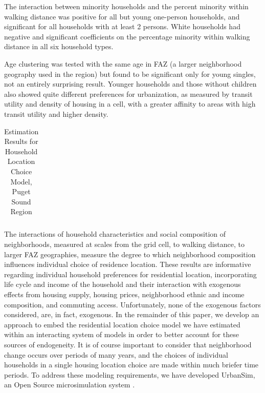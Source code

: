 \documentclass[12pt,a4paper]{article}
\begin{document}
The interaction between minority households and the percent
minority within walking distance was positive for all but young
one-person households, and significant for all households with at
least 2 persons.  White households had negative and significant
coefficients on the percentage minority within walking distance in
all six household types.

Age clustering was tested with the same age in FAZ (a larger
neighborhood geography used in the region) but found to be
significant only for young singles, not an entirely surprising
result.  Younger households and those without children also showed
quite different preferences for urbanization, as measured by transit
utility and density of housing in a cell, with a greater affinity to
areas with high transit utility and higher density.

\clearpage
\begin{table}[h]
\caption{Estimation Results for Household Location Choice Model,
Puget Sound Region} \label{tab:hlc} \centering
\begin{tabular}{lrr|rr|rr}
\\

\end{tabular}

\end{table}
\clearpage

The interactions of household characteristics and social
composition of neighborhoods, measured at scales from the grid
cell, to walking distance, to larger FAZ geographies, measure the
degree to which neighborhood composition influences individual
choice of residence location.  These results are informative regarding 
individual household
preferences for residential location, incorporating life cycle and
income of the household and their interaction with exogenous
effects from housing supply, housing prices, neighborhood ethnic
and income composition, and commuting access.  Unfortunately, none
of the exogenous factors considered, are, in fact, exogenous.  In the
remainder of this paper, we
develop an approach to embed the residential location choice
model we have estimated within an interacting system of models
in order to better account for these sources of endogeneity.  It is
of course important to consider that neighborhood change occurs
over periods of many years, and the choices of individual households
in a single housing location choice are made within much briefer
time periods.  To address these modeling requirements, we have 
developed UrbanSim, an Open Source microsimulation system
\cite{waddell-env-and-planning-2000,waddell-japa-2002,waddell-tra-2007,
sevcikova-trb-2007}.
\end{document}
